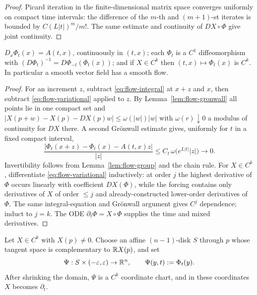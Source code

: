 \begin{proof}
Picard iteration in the finite-dimensional matrix space converges uniformly on
compact time intervals: the difference of the $m$-th and $(m+1)$-st iterates is
bounded by $C(L|t|)^m/m!$.  The same estimate and continuity of
$DX\circ\Phi$ give joint continuity.
\end{proof}

\begin{theorem}\label{thm:flow-Ck}
$D_x\Phi_t(x)=A(t,x)$, continuously in $(t,x)$; each $\Phi_t$ is a $C^1$
diffeomorphism with $(D\Phi_t)^{-1}=D\Phi_{-t}(\Phi_t(x))$; and if
$X\in C^k$ then $(t,x)\mapsto\Phi_t(x)$ is $C^k$.  In particular a smooth
vector field has a smooth flow.
\end{theorem}

\begin{proof}
For an increment $z$, subtract \eqref{eq:flow-integral} at $x+z$ and $x$, then
subtract \eqref{eq:flow-variational} applied to $z$.  By
Lemma~\ref{lem:flow-gronwall} all points lie in one compact set and
$|X(p+w)-X(p)-DX(p)w|\le\omega(|w|)|w|$ with $\omega(r)\downarrow0$ a modulus
of continuity for $DX$ there.  A second Gr\"onwall estimate gives, uniformly
for $t$ in a fixed compact interval,
\begin{equation}\label{eq:flow-differentiable}
  \frac{|\Phi_t(x+z)-\Phi_t(x)-A(t,x)z|}{|z|}
  \le C_t\,\omega\bigl(e^{L|t|}|z|\bigr)\longrightarrow0 .
\end{equation}
Invertibility follows from Lemma~\ref{lem:flow-group} and the chain rule.  For
$X\in C^k$, differentiate \eqref{eq:flow-variational} inductively: at order
$j$ the highest derivative of $\Phi$ occurs linearly with coefficient
$DX(\Phi)$, while the forcing contains only derivatives of $X$ of order
$\le j$ and already-constructed lower-order derivatives of $\Phi$.  The same
integral-equation and Gr\"onwall argument gives $C^j$ dependence; induct to
$j=k$.  The ODE $\partial_t\Phi=X\circ\Phi$ supplies the time and mixed
derivatives.
\end{proof}

\begin{theorem}\label{thm:flow-box}
Let $X\in C^k$ with $X(p)\ne0$.  Choose an affine $(n-1)$-disk $S$ through $p$
whose tangent space is complementary to $\mathbb R X(p)$, and set
\begin{equation}\label{eq:flow-box}
  \Psi:S\times(-\varepsilon,\varepsilon)\to\mathbb R^n,\qquad\Psi(y,t):=\Phi_t(y).
\end{equation}
After shrinking the domain, $\Psi$ is a $C^k$ coordinate chart, and in these
coordinates $X$ becomes $\partial_t$.
\end{theorem}

